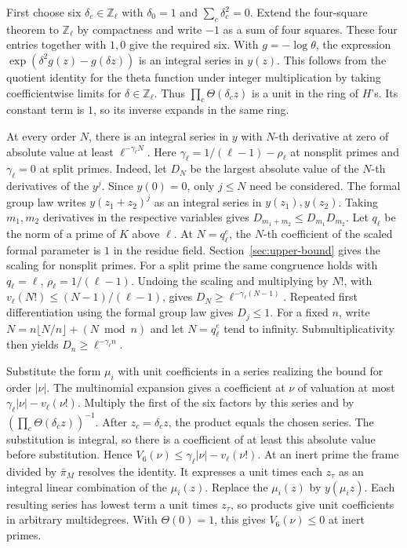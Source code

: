 First choose six \(\delta_c\in\mathbb Z_\ell\) with
\(\delta_0=1\) and \(\sum_c\delta_c^2=0\). Extend the four-square theorem to
\(\mathbb Z_\ell\) by compactness and write \(-1\) as a sum of four squares.
These four entries together with \(1,0\) give the required six.
With \(g=-\log\theta\), the expression \(\exp(\delta^2g(z)-g(\delta z))\)
is an integral series in \(y(z)\). This follows from the quotient identity
for the theta function under integer multiplication by taking coefficientwise
limits for \(\delta\in\mathbb Z_\ell\). Thus \(\prod_c\Theta(\delta_c z)\)
is a unit in the ring of \(H\)'s. Its constant term is \(1\), so its inverse
expands in the same ring.

At every order \(N\), there is an integral series in \(y\) with
\(N\)-th derivative at zero of absolute value at least \(\ell^{-\gamma_\ell N}\).
Here \(\gamma_\ell=1/(\ell-1)-\rho_\ell\) at nonsplit primes and
\(\gamma_\ell=0\) at split primes. Indeed, let \(D_N\) be the largest absolute
value of the \(N\)-th derivatives of the \(y^j\). Since \(y(0)=0\), only
\(j\le N\) need be considered. The formal group law writes \(y(z_1+z_2)^j\)
as an integral series in \(y(z_1),y(z_2)\). Taking \(m_1,m_2\) derivatives
in the respective variables gives \(D_{m_1+m_2}\le D_{m_1}D_{m_2}\).
Let \(q_\ell\) be the norm of a prime of \(K\) above \(\ell\).
At \(N=q_\ell^e\), the \(N\)-th coefficient of the scaled formal parameter
is \(1\) in the residue field. Section~\ref{sec:upper-bound} gives the scaling
for nonsplit primes. For a split prime the same congruence holds with
\(q_\ell=\ell\), \(\rho_\ell=1/(\ell-1)\).
Undoing the scaling and multiplying by \(N!\), with
\(v_\ell(N!)\le(N-1)/(\ell-1)\), gives \(D_N\ge\ell^{-\gamma_\ell(N-1)}\).
Repeated first differentiation using the formal group law gives \(D_j\le1\).
For a fixed \(n\), write \(N=n\lfloor N/n\rfloor+(N\bmod n)\) and let
\(N=q_\ell^e\) tend to infinity. Submultiplicativity then yields
\(D_n\ge\ell^{-\gamma_\ell n}\).

Substitute the form \(\mu_i\) with unit coefficients in a series realizing
the bound for order \(|\nu|\). The multinomial expansion gives a coefficient
at \(\nu\) of valuation at most \(\gamma_\ell|\nu|-v_\ell(\nu!)\).
Multiply the first of the six factors by this series and by
\((\prod_c\Theta(\delta_c z))^{-1}\). After \(z_c=\delta_c z\), the product
equals the chosen series. The substitution is integral, so there is a
coefficient of at least this absolute value before substitution. Hence
\(V_6(\nu)\le\gamma_\ell|\nu|-v_\ell(\nu!)\).
At an inert prime the frame divided by \(\bar\pi_M\) resolves the identity.
It expresses a unit times each \(z_\tau\) as an integral linear combination
of the \(\mu_i(z)\). Replace the \(\mu_i(z)\) by \(y(\mu_i z)\). Each resulting
series has lowest term a unit times \(z_\tau\), so products give unit
coefficients in arbitrary multidegrees. With \(\Theta(0)=1\), this gives
\(V_6(\nu)\le0\) at inert primes.


